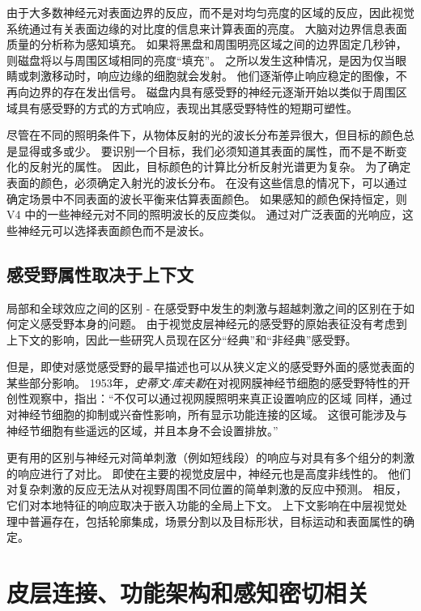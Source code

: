由于大多数神经元对表面边界的反应，而不是对均匀亮度的区域的反应，因此视觉系统通过有关表面边缘的对比度的信息来计算表面的亮度。
大脑对边界信息表面质量的分析称为感知填充。
如果将黑盘和周围明亮区域之间的边界固定几秒钟，则磁盘将以与周围区域相同的亮度“填充”。
之所以发生这种情况，是因为仅当眼睛或刺激移动时，响应边缘的细胞就会发射。
他们逐渐停止响应稳定的图像，不再向边界的存在发出信号。
磁盘内具有感受野的神经元逐渐开始以类似于周围区域具有感受野的方式的方式响应，表现出其感受野特性的短期可塑性。


尽管在不同的照明条件下，从物体反射的光的波长分布差异很大，但目标的颜色总是显得或多或少。
要识别一个目标，我们必须知道其表面的属性，而不是不断变化的反射光的属性。
因此，目标颜色的计算比分析反射光谱更为复杂。
为了确定表面的颜色，必须确定入射光的波长分布。
在没有这些信息的情况下，可以通过确定场景中不同表面的波长平衡来估算表面颜色。
如果感知的颜色保持恒定，则 V4 中的一些神经元对不同的照明波长的反应类似。
通过对广泛表面的光响应，这些神经元可以选择表面颜色而不是波长。



\subsection{感受野属性取决于上下文}

局部和全球效应之间的区别 - 在感受野中发生的刺激与超越刺激之间的区别在于如何定义感受野本身的问题。
由于视觉皮层神经元的感受野的原始表征没有考虑到上下文的影响，因此一些研究人员现在区分“经典”和“非经典”感受野。


但是，即使对感觉感受野的最早描述也可以从狭义定义的感受野外面的感觉表面的某些部分影响。
1953年，\textit{史蒂文$\cdot$库夫勒}在对视网膜神经节细胞的感受野特性的开创性观察中，指出：“不仅可以通过视网膜照明来真正设置响应的区域 同样，通过对神经节细胞的抑制或兴奋性影响，所有显示功能连接的区域。
这很可能涉及与神经节细胞有些遥远的区域，并且本身不会设置排放。”


更有用的区别与神经元对简单刺激（例如短线段）的响应与对具有多个组分的刺激的响应进行了对比。
即使在主要的视觉皮层中，神经元也是高度非线性的。
他们对复杂刺激的反应无法从对视野周围不同位置的简单刺激的反应中预测。
相反，它们对本地特征的响应取决于嵌入功能的全局上下文。
上下文影响在中层视觉处理中普遍存在，包括轮廓集成，场景分割以及目标形状，目标运动和表面属性的确定。



\section{皮层连接、功能架构和感知密切相关}

